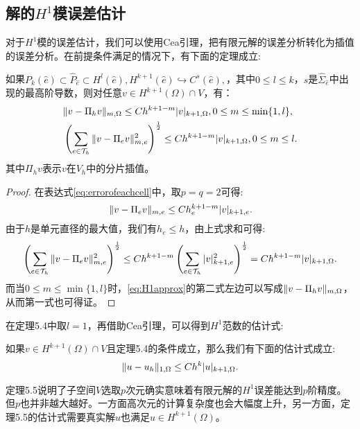 \subsection{解的$H^{1}$模误差估计}
对于$H^{1}$模的误差估计，我们可以使用Cea引理，把有限元解的误差分析转化为插值的误差分析。在前提条件满足的情况下，有下面的定理成立:
\begin{theorem}
    如果$P_{k}(\hat{e})\subset\hat{P}_{\hat{e}}\subset H^{l}(\hat{e}), H^{k+1}(\hat{e})\hookrightarrow C^{s}(\hat{e}),$，其中$0\le l\le k$，$s$是$\hat{\Sigma}_{\hat{e}}$中出现的最高阶导数，则对任意$v\in H^{k+1}(\Omega)\cap V$，有：
    \begin{equation}
        \label{eq:H1approx}
        \begin{aligned}
            &\|v-\Pi_{h}v\|_{m,\Omega}\le Ch^{k+1-m}|v|_{k+1,\Omega},0\le m\le \min\{1,l\},\\
            &\left(\sum_{e\in\mathcal{T}_{h}}\|v-\Pi_{e}v\|_{m,e}^{2}\right)^{\frac{1}{2}}\le Ch^{k+1-m}|v|_{k+1,\Omega},0\le m\le l.
        \end{aligned}
    \end{equation}
    其中$\Pi_{h}v$表示$v$在$V_{h}$中的分片插值。
\end{theorem}
\begin{proof}
    在表达式\eqref{eq:errorofeachcell}中，取$p=q=2$可得:
    \begin{equation}
        \|v-\Pi_{e}v\|_{m,e}\le Ch_{e}^{k+1-m}|v|_{k+1,e}.
    \end{equation}
    由于$h$是单元直径的最大值，我们有$h_{e}\le h$，由上式求和可得:
    \begin{equation}
        \left(\sum_{e\in\mathcal{T}_{h}}\|v-\Pi_{e}v\|_{m,e}^{2}\right)^{\frac{1}{2}}\le Ch^{k+1-m}\left(\sum_{e\in\mathcal{T}_{h}}|v|_{k+1,e}^{2}\right)^{\frac{1}{2}}=Ch^{k+1-m}|v|_{k+1,\Omega}.
    \end{equation}
    而当$0\le m\le\min\{1,l\}$时，\eqref{eq:H1approx}的第二式左边可以写成$\|v-\Pi_{h}v\|_{m,\Omega}$，从而第一式也可得证。
\end{proof}
在定理5.4中取$l=1$，再借助Cea引理，可以得到$H^{1}$范数的估计式:
\begin{theorem}
    如果$v\in H^{k+1}(\Omega)\cap V$且定理5.4的条件成立，那么我们有下面的估计式成立:
    \begin{equation}
        \label{eq:approx}
        \|u-u_{h}\|_{1,\Omega}\le Ch^{k}|u|_{k+1,\Omega}.
    \end{equation}
\end{theorem}
\begin{remark}
    定理5.5说明了子空间$V$选取$p$次元确实意味着有限元解的$H^{1}$误差能达到$p$阶精度。但$p$也并非越大越好。一方面高次元的计算复杂度也会大幅度上升，另一方面，定理5.5的估计式需要真实解$u$也满足$u\in H^{k+1}(\Omega)$。
\end{remark}

